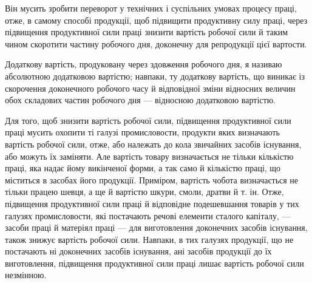 \parcont{}  %
Він мусить зробити переворот у технічних і суспільних умовах
процесу праці, отже, в самому способі продукції, щоб підвищити
продуктивну силу праці, через підвищення продуктивної сили
праці знизити вартість робочої сили й таким чином скоротити
частину робочого дня, доконечну для репродукції цієї вартости.

Додаткову вартість, продуковану через здовження робочого
дня, я називаю абсолютною додатковою вартістю; навпаки, ту
додаткову вартість, що виникає із скорочення доконечного робочого
часу й відповідної зміни відносних величин обох складових
частин робочого дня — відносною додатковою вартістю.

Для того, щоб знизити вартість робочої сили, підвищення
продуктивної сили праці мусить охопити ті галузі промисловости,
продукти яких визначають вартість робочої сили, отже, або
належать до кола звичайних засобів існування, або можуть їх
заміняти. Але вартість товару визначається не тільки кількістю
праці, яка надає йому викінченої форми, а так само й кількістю
праці, що міститься в засобах його продукції. Приміром, вартість
чобота визначається не тільки працею шевця, а ще й вартістю
шкури, смоли, дратви й т. ін. Отже, підвищення продуктивної
сили праці й відповідне подешевшання товарів у тих галузях
промисловости, які постачають речові елементи сталого капіталу, —
засоби праці й матеріял праці — для виготовлення доконечних
засобів існування, також знижує вартість робочої сили. Навпаки,
в тих галузях продукції, що не постачають ні доконечних засобів
існування, ані засобів продукції до їх виготовлення, підвищення
продуктивної сили праці лишає вартість робочої сили незмінною.

